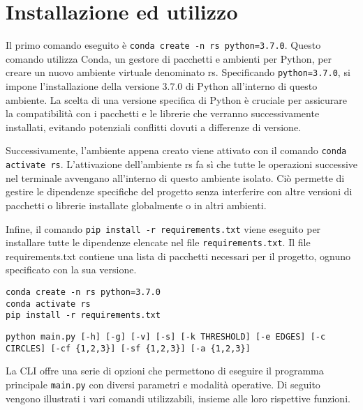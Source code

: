 \section{Installazione ed utilizzo}

Il primo comando eseguito è \texttt{conda create -n rs python=3.7.0}. Questo comando utilizza Conda, un gestore di pacchetti e ambienti per Python, per creare un nuovo ambiente virtuale denominato rs. Specificando \texttt{python=3.7.0}, si impone l'installazione della versione 3.7.0 di Python all'interno di questo ambiente. La scelta di una versione specifica di Python è cruciale per assicurare la compatibilità con i pacchetti e le librerie che verranno successivamente installati, evitando potenziali conflitti dovuti a differenze di versione.

Successivamente, l'ambiente appena creato viene attivato con il comando \texttt{conda activate rs}. L'attivazione dell'ambiente rs fa sì che tutte le operazioni successive nel terminale avvengano all'interno di questo ambiente isolato. Ciò permette di gestire le dipendenze specifiche del progetto senza interferire con altre versioni di pacchetti o librerie installate globalmente o in altri ambienti.

Infine, il comando \texttt{pip install -r requirements.txt} viene eseguito per installare tutte le dipendenze elencate nel file \texttt{requirements.txt}. Il file requirements.txt contiene una lista di pacchetti necessari per il progetto, ognuno specificato con la sua versione. 

\begin{code}
\begin{verbatim}
conda create -n rs python=3.7.0
conda activate rs
pip install -r requirements.txt
\end{verbatim}
\end{code}

\begin{code}
\begin{verbatim}
python main.py [-h] [-g] [-v] [-s] [-k THRESHOLD] [-e EDGES] [-c CIRCLES] [-cf {1,2,3}] [-sf {1,2,3}] [-a {1,2,3}]
\end{verbatim}
\end{code}

La CLI offre una serie di opzioni che permettono di eseguire il programma principale \texttt{main.py} con diversi parametri e modalità operative. Di seguito vengono illustrati i vari comandi utilizzabili, insieme alle loro rispettive funzioni.

